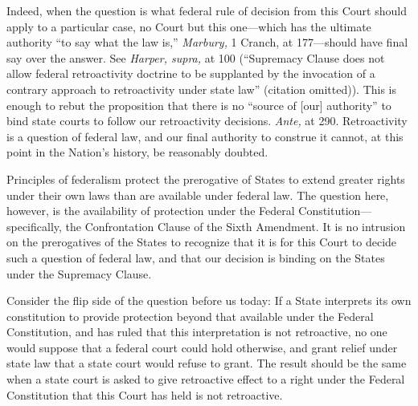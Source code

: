{  Indeed, when the question is what federal rule of decision from this Court should apply to a particular case, no Court but this one---which has the ultimate authority ``to say what the law is,'' \emph{Marbury,} 1 Cranch, at 177---should have final say over the answer. See \emph{Harper, supra,} at 100 (``Supremacy Clause does not allow federal retroactivity doctrine to \newpage  be supplanted by the invocation of a contrary approach to retroactivity under state law'' (citation omitted)). This is enough to rebut the proposition that there is no ``source of [our] authority'' to bind state courts to follow our retroactivity decisions. \emph{Ante,} at 290. Retroactivity is a question of federal law, and our final authority to construe it cannot, at this point in the Nation's history, be reasonably doubted.


  Principles of federalism protect the prerogative of States to extend greater rights under their own laws than are available under federal law. The question here, however, is the availability of protection under the Federal Constitution---specifically, the Confrontation Clause of the Sixth Amendment. It is no intrusion on the prerogatives of the States to recognize that it is for this Court to decide such a question of federal law, and that our decision is binding on the States under the Supremacy Clause.

  Consider the flip side of the question before us today: If a State interprets its own constitution to provide protection beyond that available under the Federal Constitution, and has ruled that this interpretation is not retroactive, no one would suppose that a federal court could hold otherwise, and grant relief under state law that a state court would refuse to grant. The result should be the same when a state court is asked to give retroactive effect to a right under the Federal Constitution that this Court has held is not retroactive.

}
